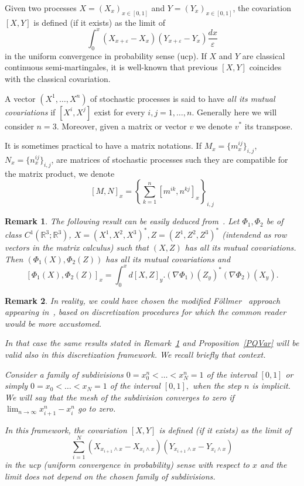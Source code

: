 \documentclass[a4paper,12pt,reqno]{amsart}
\newcommand{\R}{\mathbb{R}}
\newtheorem{remark}{Remark}
\begin{document}
 Given two processes $X = (X_x)_{x \in [0,1]} $ and 
$Y = (Y_x)_{x \in [0,1]} $, the covariation  $[X,Y]$ is defined (if it exists) as the limit
of 
$$ \int_0^x (X_{x+\varepsilon}-X_x) (Y_{x+\varepsilon}-Y_x)\frac{dx}{\varepsilon} $$
in the uniform convergence in probability sense (ucp).
If $X$ and $Y$ are classical continuous semi-martingales, 
 it is well-known that previous $[X,Y]$ coincides with the classical covariation.

 A vector $(X^1, \ldots, X^n)$ of stochastic processes
is said to have {\it all its mutual covariations} 
if $[X^i,X^j]$ exist for every $i,j = 1,\ldots, n$. 
Generally here we will consider $n = 3$. Moreover, given a matrix or vector $v$ 
we denote $v^*$ its transpose. 

It is sometimes practical to have a matrix notations.
If $M_x = \{m^{ij}_x\}_{i,j}$, 
$N_x = \{n^{ij}_x\}_{i,j}$, are matrices of stochastic
processes such they are compatible for the matrix
product, we denote
$$[M,N]_x = \left\{ \sum_{k=1}^n [m^{ik}, n^{kj}]_x\right\}_{i,j} $$ 


\begin{remark} \label{r1}
 The following result can be easily deduced
 from~\cite{rv95}.
Let $\Phi_1, \Phi_2$ be of class $C^1(\R^3; \R^3)$,
$X = (X^1, X^2, X^3)^*, Z= (Z^1,Z^2, Z^3)^* $
(intendend as row vectors in the matrix calculus)
such that $(X,Z)$ has all its mutual covariations.
Then $(\Phi_1(X), \Phi_2(Z))$ has all its mutual covariations
and $$[\Phi_1(X),\Phi_2(Z)]_x =  \int_0^x d[X,Z]_y.  (\nabla \Phi_1)(Z_y)^* (\nabla \Phi_2)(X_y). $$
\end{remark}

\begin{remark} \label{r2}
In reality, we could have chosen the modified F\"ollmer~\cite{fo} approach
appearing in~\cite{erv}, based on discretization procedures for which the common reader
would be more accustomed.

In that  case the same results stated in Remark~\ref{r1} and
Proposition~\ref{PQVar} will be valid also in this discretization framework.
We recall briefly that context.

Consider a family of subdivisions
$0  = x_0^n <  \ldots < x_N^n = 1$ of the interval $[0, 1]$
or simply 
$ 0 = x_0 <  \ldots < x_N =  1 $ of the interval $[0,1],$
when the step $n$ is implicit.
We will say that the mesh of the subdivision converges to  zero
if $\lim_{n \rightarrow \infty} x^n_{i+1} -  x^n_{i} $ go to zero.

 In this framework,  the covariation  $[X,Y]$ is defined (if it exists) as the limit
of 
$$ \sum_{i=1}^N  (X_{x_{i+1} \wedge x }- X_{x_{i} \wedge x}) (Y_{x_{i+1} \wedge x}- Y_{x_{i} \wedge x}) $$
 in the ucp (uniform convergence in probability) 
sense with respect to $x$ 
and the limit does not depend on the chosen family of subdivisions. 
\end{remark}
\end{document}
